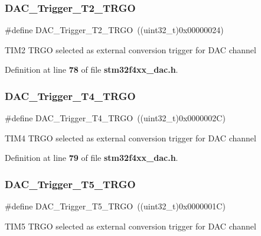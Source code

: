 \subsubsection{D\+A\+C\+\_\+\+Trigger\+\_\+\+T2\+\_\+\+T\+R\+GO}
{\footnotesize\ttfamily \#define D\+A\+C\+\_\+\+Trigger\+\_\+\+T2\+\_\+\+T\+R\+GO~((uint32\+\_\+t)0x00000024)}

T\+I\+M2 T\+R\+GO selected as external conversion trigger for D\+AC channel 

Definition at line \textbf{ 78} of file \textbf{ stm32f4xx\+\_\+dac.\+h}.

\mbox{\label{group__DAC__trigger__selection_ga58ccb2de3d22d66ee975152f5edb330a}} 
\subsubsection{D\+A\+C\+\_\+\+Trigger\+\_\+\+T4\+\_\+\+T\+R\+GO}
{\footnotesize\ttfamily \#define D\+A\+C\+\_\+\+Trigger\+\_\+\+T4\+\_\+\+T\+R\+GO~((uint32\+\_\+t)0x0000002\+C)}

T\+I\+M4 T\+R\+GO selected as external conversion trigger for D\+AC channel 

Definition at line \textbf{ 79} of file \textbf{ stm32f4xx\+\_\+dac.\+h}.

\mbox{\label{group__DAC__trigger__selection_ga35352cebfd1ae8a3d63e374a5d86a85d}} 
\subsubsection{D\+A\+C\+\_\+\+Trigger\+\_\+\+T5\+\_\+\+T\+R\+GO}
{\footnotesize\ttfamily \#define D\+A\+C\+\_\+\+Trigger\+\_\+\+T5\+\_\+\+T\+R\+GO~((uint32\+\_\+t)0x0000001\+C)}

T\+I\+M5 T\+R\+GO selected as external conversion trigger for D\+AC channel 

